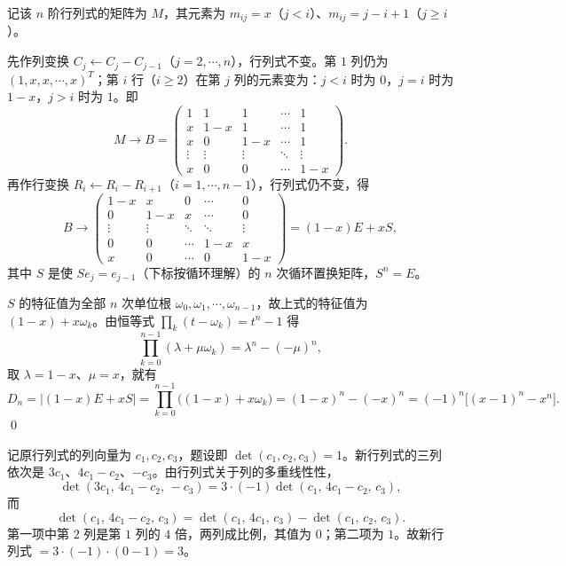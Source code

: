 \begin{solution}
记该 $n$ 阶行列式的矩阵为 $M$，其元素为 $m_{ij}=x$（$j<i$）、$m_{ij}=j-i+1$（$j\ge i$）。

先作列变换 $C_j\leftarrow C_j-C_{j-1}$（$j=2,\cdots,n$），行列式不变。第 $1$ 列仍为 $(1,x,x,\cdots,x)^{T}$；第 $i$ 行（$i\ge2$）在第 $j$ 列的元素变为：$j<i$ 时为 $0$，$j=i$ 时为 $1-x$，$j>i$ 时为 $1$。即
\[
M\to B=\begin{pmatrix}
1&1&1&\cdots&1\\
x&1-x&1&\cdots&1\\
x&0&1-x&\cdots&1\\
\vdots&\vdots&\vdots&\ddots&\vdots\\
x&0&0&\cdots&1-x
\end{pmatrix}.
\]
再作行变换 $R_i\leftarrow R_i-R_{i+1}$（$i=1,\cdots,n-1$），行列式仍不变，得
\[
B\to\begin{pmatrix}
1-x&x&0&\cdots&0\\
0&1-x&x&\cdots&0\\
\vdots&\vdots&\ddots&\ddots&\vdots\\
0&0&\cdots&1-x&x\\
x&0&\cdots&0&1-x
\end{pmatrix}=(1-x)E+xS,
\]
其中 $S$ 是使 $Se_j=e_{j-1}$（下标按循环理解）的 $n$ 次循环置换矩阵，$S^{n}=E$。

$S$ 的特征值为全部 $n$ 次单位根 $\omega_0,\omega_1,\cdots,\omega_{n-1}$，故上式的特征值为 $(1-x)+x\omega_k$。由恒等式 $\prod_k(t-\omega_k)=t^{n}-1$ 得
\[
\prod_{k=0}^{n-1}(\lambda+\mu\omega_k)=\lambda^{n}-(-\mu)^{n},
\]
取 $\lambda=1-x$、$\mu=x$，就有
\[
D_n=|(1-x)E+xS|=\prod_{k=0}^{n-1}\bigl((1-x)+x\omega_k\bigr)
=(1-x)^{n}-(-x)^{n}=(-1)^{n}\bigl[(x-1)^{n}-x^{n}\bigr].
\]
\qed
\end{solution}

\begin{solution}
记原行列式的列向量为 $c_1,c_2,c_3$，题设即 $\det(c_1,c_2,c_3)=1$。新行列式的三列依次是 $3c_1$、$4c_1-c_2$、$-c_3$。由行列式关于列的多重线性性，
\[
\det(3c_1,\,4c_1-c_2,\,-c_3)
=3\cdot(-1)\det(c_1,\,4c_1-c_2,\,c_3),
\]
而
\[
\det(c_1,\,4c_1-c_2,\,c_3)
=\det(c_1,\,4c_1,\,c_3)-\det(c_1,\,c_2,\,c_3).
\]
第一项中第 $2$ 列是第 $1$ 列的 $4$ 倍，两列成比例，其值为 $0$；第二项为 $1$。故新行列式 $=3\cdot(-1)\cdot(0-1)=3$。
\end{solution}

